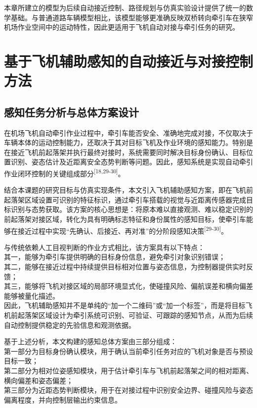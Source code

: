 \documentclass[UTF8,a4paper,12pt]{ctexart}
\begin{document}
本章所建立的模型为后续自动接近控制、路径规划与仿真实验设计提供了统一的数学基础。与普通道路车辆模型相比，该模型能够更准确反映双桥转向牵引车在狭窄机场作业空间中的运动特性，因此更适用于飞机自动对接与牵引任务的研究。

\section{基于飞机辅助感知的自动接近与对接控制方法}\label{_Toc228997183}

\subsection{感知任务分析与总体方案设计}\label{_Toc228997184}

在机场飞机自动牵引作业过程中，牵引车能否安全、准确地完成对接，不仅取决于车辆本体的运动控制能力，还取决于其对目标飞机及作业环境的感知能力。特别是在接近飞机前起落架并执行最终对接时，系统需要同时解决目标身份确认、目标位置识别、姿态估计及近距离安全态势判断等问题。因此，感知系统是实现自动牵引作业闭环控制的关键组成部分\textsuperscript{[18,29-30]}。

结合本课题的研究目标与仿真实现条件，本文引入飞机辅助感知方案，即在飞机前起落架区域设置可识别的特征标识，通过牵引车搭载的视觉与近距离传感器完成目标识别与态势获取。该方案的核心思想是：将原本难以直接观测、难以稳定识别的前起落架对接区域，转化为具有明确标志特征和身份属性的感知目标，使牵引车能够在接近过程中实现``先确认、后接近、再对准''的分阶段感知决策\textsuperscript{[29-30]}。

与传统依赖人工目视判断的作业方式相比，该方案具有以下特点：\\
其一，能够为牵引车提供明确的目标身份信息，避免牵引对象识别错误；\\
其二，能够在接近过程中持续提供目标相对位置与姿态信息，为控制器提供实时反馈；\\
其三，能够将飞机对接区域的局部环境显式化，使碰撞风险、偏航误差和横向偏差能够被量化描述。\\
因此，飞机辅助感知并不是单纯的``加一个二维码''或``加一个标签''，而是将目标飞机前起落架区域设计为牵引系统可识别、可验证、可跟踪的感知节点，从而为后续自动控制提供稳定的先验信息和观测依据。

基于上述分析，本文构建的感知总体方案由三部分组成：\\
第一部分为目标身份确认模块，用于确认当前牵引任务对应的飞机对象是否与预设目标一致；\\
第二部分为相对位姿感知模块，用于估计牵引车与飞机前起落架之间的相对距离、横向偏差和姿态偏差；\\
第三部分为近距态势判断模块，用于在对接过程中识别安全边界、碰撞风险与姿态偏离程度，并向控制层输出约束信息。
\end{document}
